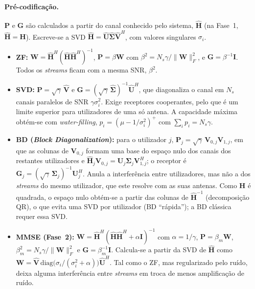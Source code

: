 \paragraph{Pré-codificação.}
$\mathbf{P}$ e $\mathbf{G}$ são calculados a partir do canal conhecido pelo sistema, $\hat{\mathbf{H}}$ (na Fase~1, $\hat{\mathbf{H}}=\mathbf{H}$). Escreve-se a SVD $\hat{\mathbf{H}}=\hat{\mathbf{U}}\hat{\boldsymbol{\Sigma}}\hat{\mathbf{V}}^{H}$, com valores singulares $\sigma_i$.
\begin{itemize}
  \item \textbf{ZF:} $\mathbf{W}=\hat{\mathbf{H}}^{H}(\hat{\mathbf{H}}\hat{\mathbf{H}}^{H})^{-1}$, $\mathbf{P}=\beta\mathbf{W}$ com $\beta^2=N_s\gamma/\|\mathbf{W}\|_F^2$, e $\mathbf{G}=\beta^{-1}\mathbf{I}$. Todos os \emph{streams} ficam com a mesma SNR, $\beta^2$.
  \item \textbf{SVD:} $\mathbf{P}=\sqrt{\gamma}\,\hat{\mathbf{V}}$ e $\mathbf{G}=(\sqrt{\gamma}\,\hat{\boldsymbol{\Sigma}})^{-1}\hat{\mathbf{U}}^{H}$, que diagonaliza o canal em $N_s$ canais paralelos de SNR $\gamma\sigma_i^2$. Exige receptores cooperantes, pelo que é um limite superior para utilizadores de uma só antena. A capacidade máxima obtém-se com \emph{water-filling}, $p_i=(\mu-1/\sigma_i^2)^{+}$ com $\sum_i p_i=N_s\gamma$.
  \item \textbf{BD (\emph{Block Diagonalization}):} para o utilizador $j$, $\mathbf{P}_j=\sqrt{\gamma}\,\mathbf{V}_{0,j}\mathbf{V}_{1,j}$, em que as colunas de $\mathbf{V}_{0,j}$ formam uma base do espaço nulo dos canais dos restantes utilizadores e $\hat{\mathbf{H}}_j\mathbf{V}_{0,j}=\mathbf{U}_j\boldsymbol{\Sigma}_j\mathbf{V}_{1,j}^{H}$; o receptor é $\mathbf{G}_j=(\sqrt{\gamma}\,\boldsymbol{\Sigma}_j)^{-1}\mathbf{U}_j^{H}$. Anula a interferência entre utilizadores, mas não a dos \emph{streams} do mesmo utilizador, que este resolve com as suas antenas. Como $\mathbf{H}$ é quadrada, o espaço nulo obtém-se a partir das colunas de $\hat{\mathbf{H}}^{-1}$ (decomposição QR), o que evita uma SVD por utilizador (BD ``rápida''); a BD clássica requer essa SVD.
  \item \textbf{MMSE (Fase~2):} $\mathbf{W}=\hat{\mathbf{H}}^{H}(\hat{\mathbf{H}}\hat{\mathbf{H}}^{H}+\alpha\mathbf{I})^{-1}$ com $\alpha=1/\gamma$, $\mathbf{P}=\beta_m\mathbf{W}$, $\beta_m^2=N_s\gamma/\|\mathbf{W}\|_F^2$ e $\mathbf{G}=\beta_m^{-1}\mathbf{I}$. Calcula-se a partir da SVD de $\hat{\mathbf{H}}$ como $\mathbf{W}=\hat{\mathbf{V}}\,\mathrm{diag}\!\big(\sigma_i/(\sigma_i^2+\alpha)\big)\hat{\mathbf{U}}^{H}$. Tal como o ZF, mas regularizado pelo ruído, deixa alguma interferência entre \emph{streams} em troca de menos amplificação de ruído.
\end{itemize}

